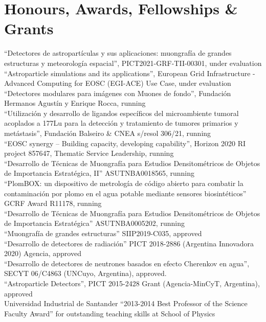 \section*{Honours, Awards, Fellowships \& Grants}
\noindent
{} ``Detectores de astropartículas y sus aplicaciones: muongrafía de grandes estructuras y meteorología espacial'', PICT2021-GRF-TII-00301, under evaluation\\
 ``Astroparticle simulations and its applications'', European Grid Infrastructure - Advanced Computing for EOSC (EGI-ACE) Use Case, under evaluation\\
 ``Detectores modulares para imágenes con Muones de fondo'', Fundación Hermanos Agustín y Enrique Rocca, running \\
 ``Utilización y desarrollo de ligandos específicos del microambiente tumoral acoplados a 177Lu para la detección y tratamiento de tumores primarios y metástasis'', Fundación Balseiro \& CNEA s/resol 306/21, running\\
 ``EOSC synergy – Building capacity, developing capability'', Horizon 2020 RI project 857647, Thematic Service Leadership, running \\
 ``Desarrollo de Técnicas de Muongrafía para Estudios Densitométricos de Objetos de Importancia Estratégica, II'' ASUTNBA0018565, running\\
 ``PlomBOX: un dispositivo de metrología de código abierto para combatir la contaminación por plomo en el agua potable mediante sensores biosintéticos'' GCRF Award R11178, running\\
 ``Desarrollo de Técnicas de Muongrafía para Estudios Densitométricos de Objetos de Importancia Estratégica'' ASUTNBA0005202, running\\
 ``Muongrafía de grandes estructuras'' SIIP2019-C035, approved\\
 ``Desarrollo de detectores de radiación'' PICT 2018-2886 (Argentina Innovadora 2020) Agencia, approved\\
 ``Desarrollo de detectores de neutrones basados en efecto Cherenkov en agua'', SECYT 06/C4863 (UNCuyo, Argentina), approved.\\
 ``Astroparticle Detectors'', PICT 2015-2428 Grant (Agencia-MinCyT, Argentina), approved\\
 Universidad Industrial de Santander ``2013-2014 Best Professor of the Science Faculty Award'' for outstanding teaching skills at School of Physics\\
